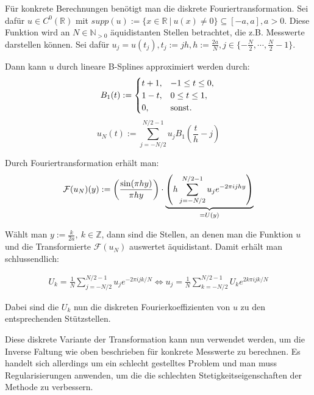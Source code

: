 \documentclass{article}
\newcommand{\R}[0]{\mathbb{R}}
\begin{document}
Für konkrete Berechnungen benötigt man die diskrete Fouriertransformation. 
Sei dafür $u \in C^0(\R)$ mit $supp(u) := \{x \in \R \: | \: u(x) \neq 0 \} \subseteq [-a, a], a > 0$. Diese Funktion wird an $N \in \mathbb{N}_{>0}$ äquidistanten Stellen betrachtet, 
die z.B. Messwerte darstellen können. Sei dafür $u_j = u(t_j), t_j := jh, h:= \frac{2a}{N}, j \in \{-\frac{N}{2}, \cdots, \frac{N}{2} - 1\}$.

Dann kann $u$ durch lineare B-Splines approximiert werden durch:
\begin{equation}
    B_1(t) := \begin{cases}
        t + 1, &-1 \leq t \leq 0, \\
        1 - t, &0 \leq t \leq 1, \\
        0, &{\rm sonst}.
    \end{cases} \\
\end{equation}
\begin{equation}
    u_N(t) := \sum\limits_{j=-N/2}^{N/2-1} u_j B_1 \left(\frac{t}{h} - j\right)
\end{equation}

Durch Fouriertransformation erhält man:
\begin{equation}
    \mathcal{F}(u_N)(y) := \left(\frac{{\rm sin}(\pi h y)}{\pi h y}\right) \cdot \underbrace{\left(h \sum\limits_{j=-N/2}^{N/2-1} u_j e^{-2\pi i jhy}\right)}_{=U(y)}
\end{equation}

Wählt man $y := \frac{k}{2a}, \: k \in \mathbb{Z}$, dann sind die Stellen, an denen man die Funktion $u$ und die Transformierte $\mathcal{F}(u_N)$
auswertet äquidistant. Damit erhält man schlussendlich:

\begin{align}
    U_k = \frac{1}{N} \sum\limits_{j=-N/2}^{N/2-1} u_j e^{-2\pi ijk/N}
\iff u_j = \frac{1}{N} \sum\limits_{k=-N/2}^{N/2-1} U_k e^{2k\pi ijk/N}
\end{align}

Dabei sind die $U_k$ nun die diskreten Fourierkoeffizienten von $u$ zu den entsprechenden Stützstellen.

Diese diskrete Variante der Transformation kann nun verwendet werden, um die Inverse Faltung wie oben beschrieben für konkrete Messwerte zu berechnen. 
Es handelt sich allerdings um ein schlecht gestelltes Problem und man muss Regularisierungen anwenden, um die die schlechten Stetigkeitseigenschaften der Methode zu verbessern. 
\end{document}
